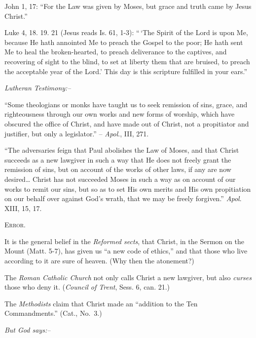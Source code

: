 \documentclass[
]{book}
\begin{document}
John 1, 17: ``For the Law was given by Moses, but grace and truth came by Jesus Christ.''

Luke 4, 18. 19. 21 (Jesus reads Is. 61, 1-3): ``\,`The Spirit of the Lord is upon Me, because He hath annointed Me to preach the Gospel to the poor; He hath sent Me to heal the broken-hearted, to preach deliverance to the captives, and recovering of sight to the blind, to set at liberty them that are bruised, to preach the acceptable year of the Lord.' This day is this scripture fulfilled in your ears.''

\begin{center}
\textsl{Lutheran Testimony:--}
\end{center}

``Some theologians or monks have taught us to seek remission of sins, grace, and righteousness through our own works and new forms of worship, which have obscured the office of Christ, and have made out of Christ, not a propitiator and justifier, but only a legislator.'' -- \emph{Apol}., III, 271.

``The adversaries feign that Paul abolishes the Law of Moses, and that Christ succeeds as a new lawgiver in such a way that He does not freely grant the remission of sins, but on account of the works of other laws, if any are now desired\ldots{} Christ has not succeeded Moses in such a way as on account of our works to remit our sins, but so as to set His own merits and His own propitiation on our behalf over against God's wrath, that we may be freely forgiven.'' \emph{Apol}. XIII, 15, 17.

\begin{center}
\textsc{Error.}
\end{center}

It is the general belief in the \emph{Reformed sects}, that Christ, in the Sermon on the Mount (Matt. 5-7), has given us ``a new code of ethics,'' and that those who live according to it are sure of heaven. (Why then the atonement?)

The \emph{Roman Catholic Church} not only calls Christ a new lawgiver, but also \emph{curses} those who deny it. (\emph{Council of Trent}, Sess. 6, can. 21.)

The \emph{Methodists} claim that Christ made an ``addition to the Ten Commandments.'' (Cat., No.~3.)

\begin{center}
\textsl{But God says:--}
\end{center}
\end{document}
